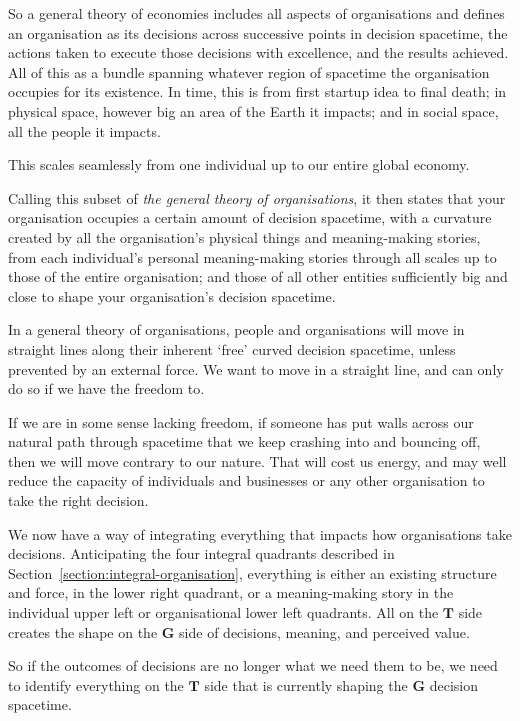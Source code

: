 So a general theory of economies  includes all aspects of organisations and defines an organisation as its decisions across successive points in decision spacetime, the actions taken to execute those decisions with excellence, and the results achieved. All of this as a bundle spanning whatever region of spacetime the organisation occupies for its existence. In time, this is from first startup idea to final death; in physical space, however big an area of the Earth it impacts; and in social space, all the people it impacts.


This scales seamlessly from one individual up to our entire global economy.


Calling this subset of \emph{the general theory of organisations}, it then states that your organisation occupies a certain amount of decision spacetime, with a curvature created by all the organisation’s physical things and meaning\hyp{}making stories, from each individual's personal meaning\hyp{}making stories through all scales up to those of the entire organisation; and those of all other entities sufficiently big and close to shape your organisation’s decision spacetime.


In a general theory of organisations, people and organisations will move in straight lines along their inherent ‘free’ curved decision spacetime,  unless prevented by an external force. We want to move in a straight line, and can only do so if we have the freedom to. 


If we are in some sense lacking freedom,  if someone has put walls across our natural path through spacetime that we keep crashing into and bouncing off, then we will move contrary to our nature. That will cost us energy,  and may well reduce the capacity of individuals and businesses or any other organisation to take the right decision.


We now have a way of integrating everything that impacts how organisations take decisions. Anticipating the four integral quadrants described in Section~\ref{section:integral-organisation}, everything is either an existing structure and force, in the lower right quadrant, or a meaning\hyp{}making story in the individual upper left or organisational lower left quadrants. All on the $\textbf{T}$ side creates the shape on the $\textbf{G}$ side of decisions, meaning, and perceived value.


So if the outcomes of decisions are no longer what we need them to be, we need to identify everything on the $\textbf{T}$ side that is currently shaping the $\textbf{G}$ decision spacetime. 


